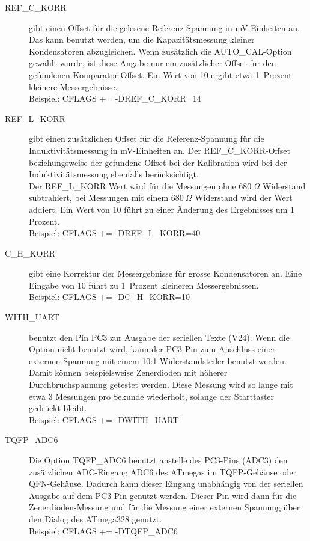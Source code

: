 \begin{description}
  \item[REF\_C\_KORR] gibt einen Offset für die gelesene Referenz-Spannung in mV-Einheiten an.
Das kann benutzt werden, um die Kapazitätsmessung kleiner Kondensatoren abzugleichen.
Wenn zusätzlich die AUTO\_CAL-Option gewählt wurde, ist diese Angabe nur ein zusätzlicher Offset für
den gefundenen Komparator-Offset.
Ein Wert von 10 ergibt etwa 1~Prozent kleinere Messergebnisse.\\
Beispiel: CFLAGS += -DREF\_C\_KORR=14

  \item[REF\_L\_KORR] gibt einen zusätzlichen Offset für die Referenz-Spannung für die Induktivitätsmessung
in mV-Einheiten an. Der REF\_C\_KORR-Offset beziehungsweise der gefundene Offset bei der Kalibration
wird bei der Induktivitätsmessung ebenfalls berücksichtigt.\\
Der REF\_L\_KORR Wert wird für die Messungen ohne \(680~\Omega\) Widerstand subtrahiert, bei Messungen mit einem
\(680~\Omega\) Widerstand wird der Wert addiert.
Ein Wert von 10 führt zu einer Änderung des Ergebnisses um 1 Prozent.\\
Beispiel: CFLAGS += -DREF\_L\_KORR=40

  \item[C\_H\_KORR] gibt eine Korrektur der Messergebnisse für grosse Kondensatoren an.
Eine Eingabe von 10 führt zu 1~Prozent kleineren Messergebnissen.\\
Beispiel: CFLAGS += -DC\_H\_KORR=10

  \item[WITH\_UART] benutzt den Pin PC3 zur Ausgabe der seriellen Texte (V24). Wenn die Option nicht
benutzt wird, kann der PC3 Pin zum Anschluss einer externen Spannung mit einem 10:1-Widerstandsteiler benutzt
werden. Damit können beispielsweise Zenerdioden mit höherer Durchbruchspannung getestet werden.
Diese Messung wird so lange mit etwa 3 Messungen pro Sekunde wiederholt, solange der Starttaster gedrückt bleibt.\\
Beispiel: CFLAGS += -DWITH\_UART

  \item[TQFP\_ADC6] Die Option TQFP\_ADC6 benutzt anstelle des PC3-Pins (ADC3) den zusätzlichen ADC-Eingang ADC6
des ATmegas im TQFP-Gehäuse oder QFN-Gehäuse.
Dadurch kann dieser Eingang unabhängig von der seriellen Ausgabe auf dem PC3 Pin genutzt werden. Dieser Pin wird
dann für die Zenerdioden-Messung und für die Messung einer externen Spannung über den Dialog des ATmega328 genutzt.\\
Beispiel: CFLAGS += -DTQFP\_ADC6


\end{description}
